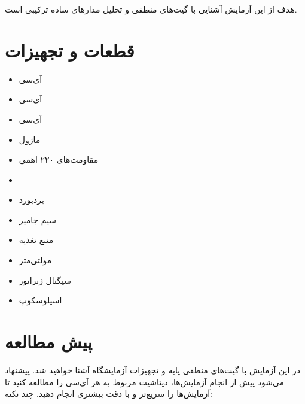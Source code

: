 \documentclass[12pt]{article}
\begin{document}
\fontsize{12pt}{14pt}\selectfont



هدف از این آزمایش آشنایی با گیت‌های منطقی و تحلیل مدار‌های ساده ترکیبی است.

\section{قطعات و تجهیزات}
\begin{itemize}
    \item آی‌سی  
    \item آی‌سی  
    \item آی‌سی 
    \item ماژول 
    \item مقاومت‌های ۲۲۰ اهمی 
    \item {}
    \item بردبورد
    \item سیم جامپر
    \item منبع تغذیه
    \item مولتی‌متر
    \item سیگنال ژنراتور
    \item اسیلوسکوپ
\end{itemize}

\section{پیش مطالعه}
در این آزمایش با گیت‌های منطقی پایه و تجهیزات آزمایشگاه آشنا خواهید شد. پیشنهاد می‌شود پیش از انجام آزمایش‌ها، دیتاشیت مربوط به هر آی‌سی را مطالعه کنید تا آزمایش‌ها را سریع‌تر و با دقت بیشتری انجام دهید. چند نکته:
\end{document}
